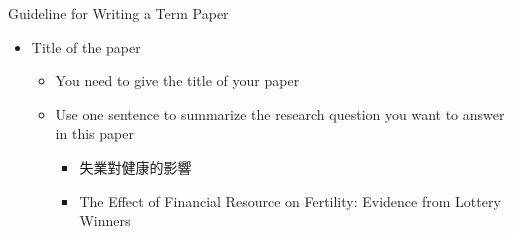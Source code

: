 \documentclass[dvipsnames,hyperref={pdfpagelabels=false}]{beamer}
\begin{document}
\begin{frame}{Guideline for Writing a Term Paper}
	\begin{itemize} 
		\item[0] Title of the paper
		\vspace{0.3cm}
		\begin{itemize} 
			
			\item You need to give the title of your paper
					\vspace{0.3cm}
			\item Use one sentence to summarize the research question you want to answer in this paper
			
			\vspace{0.3cm}
			\begin{itemize} 
			\item 失業對健康的影響
						\vspace{0.3cm}
			\item The Effect of Financial Resource on Fertility: Evidence from Lottery Winners
					\end{itemize}
		\end{itemize}
		
		
	\end{itemize}
\end{frame}
\end{document}
